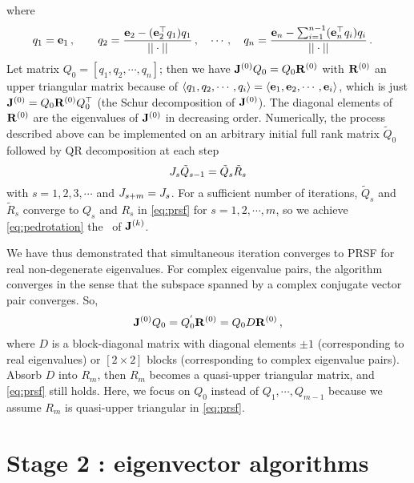 where
\[
  \begin{aligned}
    & q_{1} = \jEigvec[1]\,,\qquad
    q_{2} = \frac{\jEigvec[2]-(\jEigvec[2]^\top q_{1})q_{1}}{||\cdot ||}\,,
    \quad \cdots\,,\quad
    q_{n} = \frac{\jEigvec[n]-\sum_{i=1}^{n-1}(\jEigvec[n]^\top
      q_{i})q_{i}}{||\cdot ||}
    \,.
  \end{aligned}
\]
Let matrix $Q_{0}=[q_{1},q_{2},\cdots ,q_{n}]$; then we have
$\ps{\jMps}{0}Q_{0}=Q_{0}\ps{R}{0}$ with $\ps{R}{0}$ an upper triangular
matrix because of $\langle q_{1},q_{2},\cdots,q_{i} \rangle=\langle
{\jEigvec[1], \jEigvec[2], \cdots,  \jEigvec[i]} \rangle$, which is just
$\ps{\jMps}{0}=Q_{0}\ps{R}{0}Q^\top_{0}$ (the Schur decomposition of
$\ps{\jMps}{0}$). The diagonal elements of $\ps{R}{0}$ are the
eigenvalues of $\ps{\jMps}{0}$ in decreasing order.
Numerically, the process described above can be implemented on an
arbitrary initial full rank matrix $\tilde{Q}_0$ followed by QR
decomposition at
{each step
  \begin{equation}
    \label{eq:qr}
    \jMps_{s}\tilde{Q}_{s-1}=\tilde{Q}_{s}\tilde{R}_{s}
  \end{equation}
  with}
$s=1,2,3,\cdots$ and $\jMps_{s+m}=\jMps_{s}$. For a sufficient number of
iterations, $\tilde{Q}_{s}$ and $\tilde{R}_{s}$ converge to $Q_{s}$ and
$R_{s}$ in \eqref{eq:prsf} for $s=1,2,\cdots,{m}$, so we achieve
\eqref{eq:pedrotation} the \psd\ of $\ps{\jMps}{k}$.

We have thus demonstrated that simultaneous iteration converges to
PRSF for real non-degenerate eigenvalues.
For complex eigenvalue pairs, the algorithm converges in the sense that
the subspace spanned by a complex conjugate vector pair converges. So,
\begin{equation}
  \label{eq:simcplx}
  \ps{\jMps}{0}Q_{0}=Q^{'}_{0}\ps{R}{0}=Q_{0}D\ps{R}{0}
  \,,
\end{equation}
where $D$ is a block-diagonal matrix with diagonal elements $\pm 1$
(corresponding to real eigenvalues) or $[2\!\times\! 2]$ blocks
(corresponding to complex eigenvalue pairs). Absorb $D$ into $R_{m}$,
then $R_{m}$ becomes a quasi-upper triangular matrix, and \eqref{eq:prsf}
still holds.
{Here, we focus on $Q_0$ instead of $Q_1,\cdots,Q_{m-1}$ because we
  assume $R_m$ is quasi-upper triangular in \eqref{eq:prsf}}.


\section{Stage 2 : eigenvector algorithms}
\label{sect:eigenvec}


